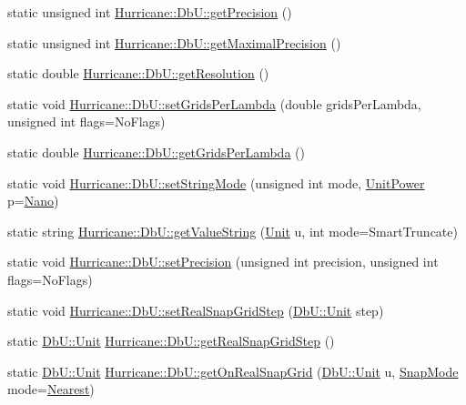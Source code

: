 \begin{DoxyCompactItemize}
static unsigned int \mbox{\hyperlink{group__DbUGroup_ga6169efbdd9b3d54a0bd8467c8f957fda}{Hurricane\+::\+Db\+U\+::get\+Precision}} ()
\item 
static unsigned int \mbox{\hyperlink{group__DbUGroup_ga8756c9f0a32af5f601cd150e73b02c03}{Hurricane\+::\+Db\+U\+::get\+Maximal\+Precision}} ()
\item 
static double \mbox{\hyperlink{group__DbUGroup_ga120a60b09b344d01c583567a1e489d9e}{Hurricane\+::\+Db\+U\+::get\+Resolution}} ()
\item 
static void \mbox{\hyperlink{group__DbUGroup_gac93f9ba2a09105227e34bd05bcb1500c}{Hurricane\+::\+Db\+U\+::set\+Grids\+Per\+Lambda}} (double grids\+Per\+Lambda, unsigned int flags=No\+Flags)
\item 
static double \mbox{\hyperlink{group__DbUGroup_ga9a0359adbfafc356326f5c6adf57ff04}{Hurricane\+::\+Db\+U\+::get\+Grids\+Per\+Lambda}} ()
\item 
static void \mbox{\hyperlink{group__DbUGroup_ga89ab8f8326c54113336086663ecf1d25}{Hurricane\+::\+Db\+U\+::set\+String\+Mode}} (unsigned int mode, \mbox{\hyperlink{group__DbUGroup_ga50b5785bf4d75026c4c112caec3040a7}{Unit\+Power}} p=\mbox{\hyperlink{group__DbUGroup_gga50b5785bf4d75026c4c112caec3040a7a03e5923be5810db830626f2ca26319d6}{Nano}})
\item 
static string \mbox{\hyperlink{group__DbUGroup_gadc9c1a06b4296dbddcf711077113f4bd}{Hurricane\+::\+Db\+U\+::get\+Value\+String}} (\mbox{\hyperlink{group__DbUGroup_ga4fbfa3e8c89347af76c9628ea06c4146}{Unit}} u, int mode=Smart\+Truncate)
\item 
static void \mbox{\hyperlink{group__DbUGroup_gace9a8644e7e80dcaed2a8a95deeb1622}{Hurricane\+::\+Db\+U\+::set\+Precision}} (unsigned int precision, unsigned int flags=No\+Flags)
\item 
static void \mbox{\hyperlink{group__DbUGroup_ga202cc3aa3364c2224647a29dde047fae}{Hurricane\+::\+Db\+U\+::set\+Real\+Snap\+Grid\+Step}} (\mbox{\hyperlink{group__DbUGroup_ga4fbfa3e8c89347af76c9628ea06c4146}{Db\+U\+::\+Unit}} step)
\item 
static \mbox{\hyperlink{group__DbUGroup_ga4fbfa3e8c89347af76c9628ea06c4146}{Db\+U\+::\+Unit}} \mbox{\hyperlink{group__DbUGroup_ga09e46fcca6aaca94851adfa196e10170}{Hurricane\+::\+Db\+U\+::get\+Real\+Snap\+Grid\+Step}} ()
\item 
static \mbox{\hyperlink{group__DbUGroup_ga4fbfa3e8c89347af76c9628ea06c4146}{Db\+U\+::\+Unit}} \mbox{\hyperlink{group__DbUGroup_ga8746e486f153aa37ee469c1604eba5c0}{Hurricane\+::\+Db\+U\+::get\+On\+Real\+Snap\+Grid}} (\mbox{\hyperlink{group__DbUGroup_ga4fbfa3e8c89347af76c9628ea06c4146}{Db\+U\+::\+Unit}} u, \mbox{\hyperlink{group__DbUGroup_ga1082168d6f9956ebba22ab8bbec21637}{Snap\+Mode}} mode=\mbox{\hyperlink{group__DbUGroup_gga1082168d6f9956ebba22ab8bbec21637a65e6f47eb16779b8974a80d6145a2db5}{Nearest}})

\end{DoxyCompactItemize}

